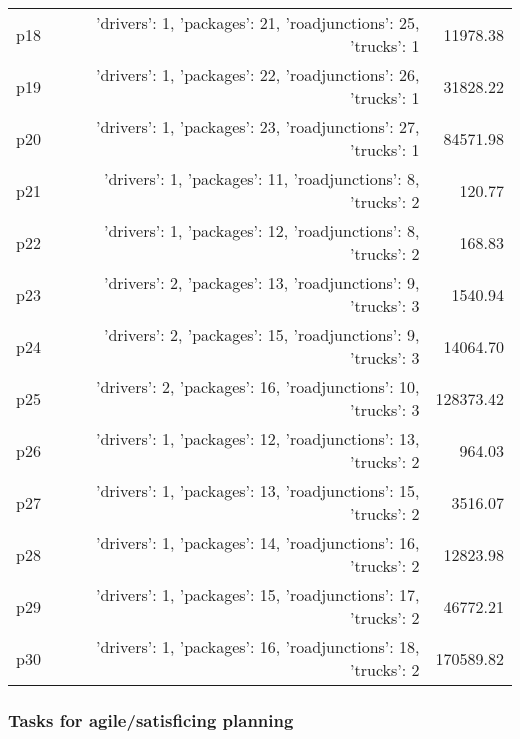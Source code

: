 \documentclass{article}
\begin{document}
\begin{center}
\begin{tabular}{@{}l|r|r@{}}
  p18&{'drivers': 1, 'packages': 21, 'roadjunctions': 25, 'trucks': 1}&11978.38\\
  p19&{'drivers': 1, 'packages': 22, 'roadjunctions': 26, 'trucks': 1}&31828.22\\
  p20&{'drivers': 1, 'packages': 23, 'roadjunctions': 27, 'trucks': 1}&84571.98\\
  p21&{'drivers': 1, 'packages': 11, 'roadjunctions': 8, 'trucks': 2}&120.77\\
  p22&{'drivers': 1, 'packages': 12, 'roadjunctions': 8, 'trucks': 2}&168.83\\
  p23&{'drivers': 2, 'packages': 13, 'roadjunctions': 9, 'trucks': 3}&1540.94\\
  p24&{'drivers': 2, 'packages': 15, 'roadjunctions': 9, 'trucks': 3}&14064.70\\
  p25&{'drivers': 2, 'packages': 16, 'roadjunctions': 10, 'trucks': 3}&128373.42\\
  p26&{'drivers': 1, 'packages': 12, 'roadjunctions': 13, 'trucks': 2}&964.03\\
  p27&{'drivers': 1, 'packages': 13, 'roadjunctions': 15, 'trucks': 2}&3516.07\\
  p28&{'drivers': 1, 'packages': 14, 'roadjunctions': 16, 'trucks': 2}&12823.98\\
  p29&{'drivers': 1, 'packages': 15, 'roadjunctions': 17, 'trucks': 2}&46772.21\\
  p30&{'drivers': 1, 'packages': 16, 'roadjunctions': 18, 'trucks': 2}&170589.82
                            \end{tabular}
                            \end{center}
                    

                                \subsubsection*{Tasks for agile/satisficing planning}
                                
\end{document}
